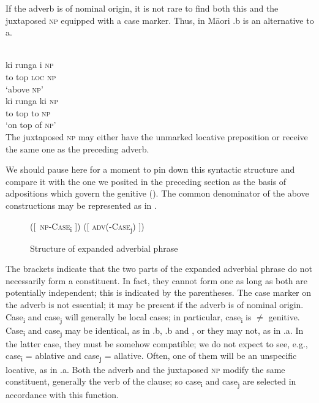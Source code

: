 If the adverb is of nominal origin, it is not rare to find both this and the juxtaposed \textsc{np} equipped with a case marker. Thus, in M\=aori .b is an alternative to a.

\ea\label{ex:E67}
 \\
 \ea
 \gll ki  runga  i  \textsc{np}  \\
  to  top  \textsc{loc}  \textsc{np} \\
\glt ‘above \textsc{np}’\\
\ex
\gll ki  runga  ki  \textsc{np}  \\
  to  top to  \textsc{np} \\
  \glt ‘on top of \textsc{np}’\\
\z
\z
\noindent The juxtaposed \textsc{np} may either have the unmarked locative preposition or receive the same one as the preceding adverb.

We should pause here for a moment to pin down this syntactic structure and compare it with the one we posited in the preceding section as the basis of adpositions which govern the genitive (). The common denominator of the above constructions may be represented as in .

\begin{figure}
([~\textsc{np}-\textsc{Case}\textsubscript{i} ])  ([ \textsc{adv}(-\textsc{Case}\textsubscript{j}) ])
\caption{Structure of expanded adverbial phrase}\label{ex:F5}
\end{figure}

\noindent The brackets indicate that the two parts of the expanded adverbial phrase do not necessarily form a constituent. In fact, they cannot form one as long as both are potentially independent; this is indicated by the parentheses. The case marker on the adverb is not essential; it may be present if the adverb is of nominal origin. Case\textsubscript{i} and case\textsubscript{j} will generally be local cases; in particular, case\textsubscript{i} is ${\neq}$ genitive. Case\textsubscript{i} and case\textsubscript{j} may be identical, as in .b, .b and , or they may not, as in .a. In the latter case, they must be somehow compatible; we do not expect to see, e.g., case\textsubscript{i} = ablative and case\textsubscript{j} = allative. Often, one of them will be an unspecific locative, as in .a. Both the adverb and the juxtaposed \textsc{np} modify the same constituent, generally the verb of the clause; so case\textsubscript{i} and case\textsubscript{j} are selected in accordance with this function.

